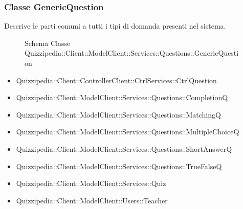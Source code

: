 \subsubsection{Classe GenericQuestion}
Descrive le parti comuni a tutti i tipi di domanda presenti nel sistema.
\begin{figure}[H]
\centering
\noindent{}
\caption{Schema Classe Quizzipedia::Client::ModelClient::Services::Questions::GenericQuestion}
\end{figure}
\begin{itemize}
\item Quizzipedia::Client::ControllerClient::CtrlServices::CtrlQuestion
\item Quizzipedia::Client::ModelClient::Services::Questions::CompletionQ
\item Quizzipedia::Client::ModelClient::Services::Questions::MatchingQ
\item Quizzipedia::Client::ModelClient::Services::Questions::MultipleChoiceQ
\item Quizzipedia::Client::ModelClient::Services::Questions::ShortAnswerQ
\item Quizzipedia::Client::ModelClient::Services::Questions::TrueFalseQ
\item Quizzipedia::Client::ModelClient::Services::Quiz
\item Quizzipedia::Client::ModelClient::Users::Teacher
\end{itemize}
